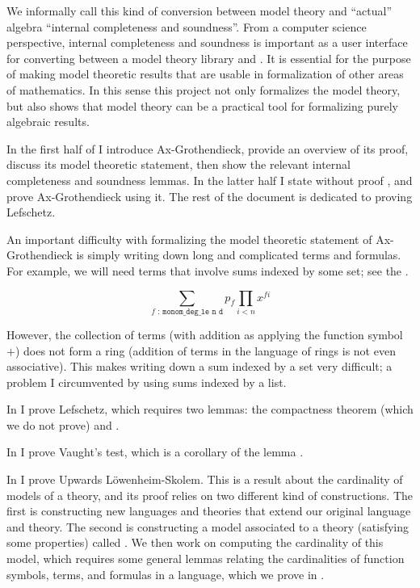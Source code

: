 We informally call this kind of conversion between model theory and ``actual'' algebra
``internal completeness and soundness''.
From a computer science perspective,
internal completeness and soundness is important as a user interface for
converting between a model theory library and .
It is essential for the purpose of making model theoretic results that
are usable in formalization of other areas of mathematics.
In this sense this project not only formalizes the model theory,
but also shows that model theory can be a practical tool for formalizing
purely algebraic results.

In the first half of  I introduce Ax-Grothendieck,
provide an overview of its proof,
discuss its model theoretic statement,
then show the relevant internal completeness and soundness lemmas.
In the latter half I state without proof ,
and prove Ax-Grothendieck using it.
The rest of the document is dedicated to proving Lefschetz.

An important difficulty with formalizing the model theoretic statement of Ax-Grothendieck
is simply writing down long and complicated terms and formulas.
For example, we will need terms that involve sums indexed by some set;
see the .

\[ \sum_{f\texttt{ : monom\_deg\_le n d}} p_{f}\prod_{i < n} x^{f i}\]

However, the collection of terms (with addition as applying the function symbol $+$)
does not form a ring (addition of terms in the language of rings is not even associative).
This makes writing down a sum indexed by a set very difficult;
a problem I circumvented by using sums indexed by a list.

In  I prove Lefschetz,
which requires two lemmas: the compactness theorem (which we do not prove)
and .

In  I prove Vaught's test,
which is a corollary of the lemma .

In  I prove Upwards L\"{o}wenheim-Skolem.
This is a result about the cardinality of models of a theory,
and its proof relies on two different kind of constructions.
The first is constructing new languages and theories that
extend our original language and theory.
The second is constructing a model associated to a theory (satisfying some properties)
called .
We then work on computing the cardinality of this model,
which requires some general lemmas relating the cardinalities
of function symbols, terms, and formulas in a language,
which we prove in .

